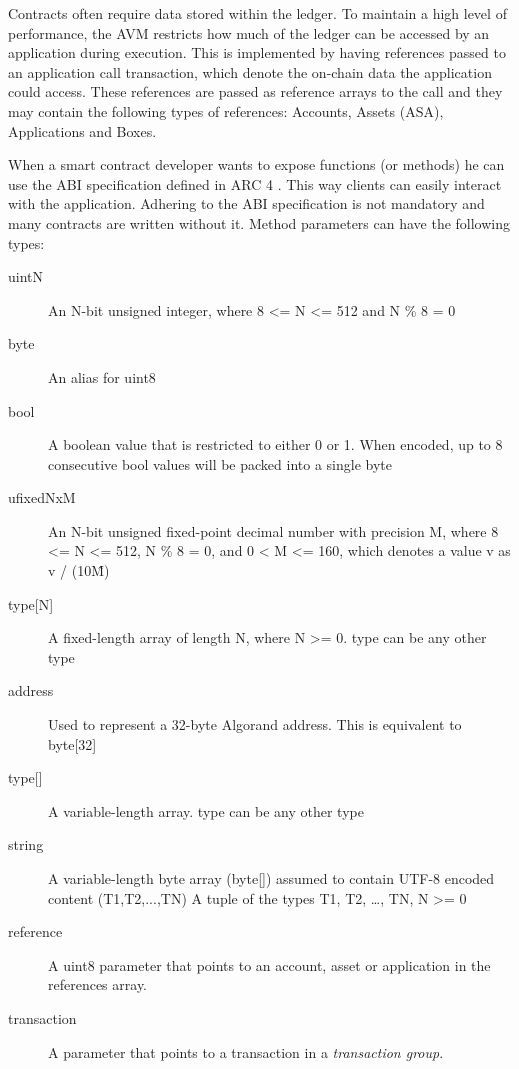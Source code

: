 Contracts often require data stored within the ledger. To maintain a high level of performance, the \ac{AVM} restricts how much of the ledger can be accessed by an application during execution. This is implemented by having references passed to an application call transaction, which denote the on-chain data the application could access. These references are passed as reference arrays to the call and they may contain the following types of references: Accounts, Assets (\ac{ASA}), Applications and Boxes.

When a smart contract developer wants to expose functions (or methods) he can use the \ac{ABI} specification defined in \ac{ARC} 4 \cite{noauthor_arcsarcsarc-0004md_nodate}. This way clients can easily interact with the application. Adhering to the \ac{ABI} specification is not mandatory and many contracts are written without it. Method parameters can have the following types:
\begin{description}
    \item[uintN] An N-bit unsigned integer, where 8 <= N <= 512 and N \% 8 = 0
    \item[byte]	An alias for uint8
    \item[bool]	A boolean value that is restricted to either 0 or 1. When encoded, up to 8 consecutive bool values will be packed into a single byte
    \item[ufixedNxM] An N-bit unsigned fixed-point decimal number with precision M, where 8 <= N <= 512, N \% 8 = 0, and 0 < M <= 160, which denotes a value v as v / (10\^M)

        \item[{type[N]}] A fixed-length array of length N, where N >= 0. type can be any other type
    \item[address] Used to represent a 32-byte Algorand address. This is equivalent to byte[32]

        \item[{type[]}] A variable-length array. type can be any other type
    \item[string] A variable-length byte array (byte[]) assumed to contain UTF-8 encoded content
        (T1,T2,...,TN) A tuple of the types T1, T2, …, TN, N >= 0
    \item[reference] A uint8 parameter that points to an account, asset or application in the references array.
    \item[transaction] A parameter that points to a transaction in a \textit{transaction group}.
\end{description}

